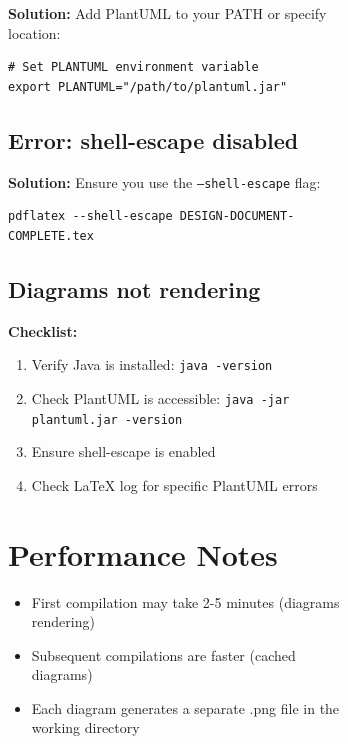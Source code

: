 \documentclass[12pt,a4paper]{report}
\begin{document}
\begin{figure}[H]
\begin{plantuml}
\begin{figure}[H]
\begin{plantuml}
\textbf{Solution:} Add PlantUML to your PATH or specify location:

\begin{lstlisting}[style=bashStyle]
# Set PLANTUML environment variable
export PLANTUML="/path/to/plantuml.jar"
\end{lstlisting}

\subsection{Error: shell-escape disabled}

\textbf{Solution:} Ensure you use the \texttt{--shell-escape} flag:

\begin{lstlisting}[style=bashStyle]
pdflatex --shell-escape DESIGN-DOCUMENT-COMPLETE.tex
\end{lstlisting}

\subsection{Diagrams not rendering}

\textbf{Checklist:}
\begin{enumerate}
    \item Verify Java is installed: \texttt{java -version}
    \item Check PlantUML is accessible: \texttt{java -jar plantuml.jar -version}
    \item Ensure shell-escape is enabled
    \item Check LaTeX log for specific PlantUML errors
\end{enumerate}

\section{Performance Notes}

\begin{itemize}
    \item First compilation may take 2-5 minutes (diagrams rendering)
    \item Subsequent compilations are faster (cached diagrams)
    \item Each diagram generates a separate .png file in the working directory
\end{itemize}



\end{plantuml}
\end{figure}
\end{plantuml}
\end{figure}
\end{document}
